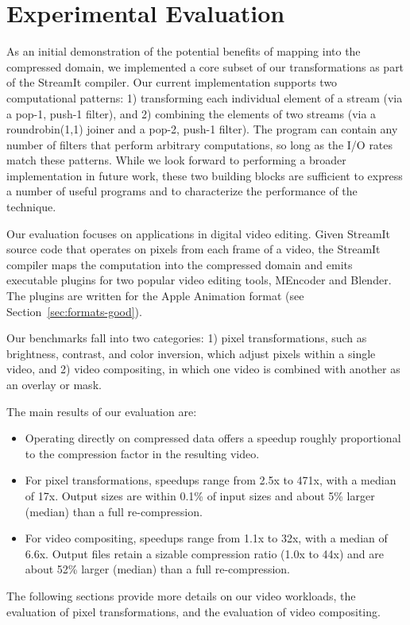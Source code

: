 \myend

\section{Experimental Evaluation}

As an initial demonstration of the potential benefits of mapping into
the compressed domain, we implemented a core subset of our
transformations as part of the StreamIt compiler.  Our current
implementation supports two computational patterns: 1) transforming
each individual element of a stream (via a pop-1, push-1 filter), and
2) combining the elements of two streams (via a roundrobin(1,1) joiner
and a pop-2, push-1 filter).  The program can contain any number of
filters that perform arbitrary computations, so long as the I/O rates
match these patterns.  While we look forward to performing a broader
implementation in future work, these two building blocks are
sufficient to express a number of useful programs and to characterize
the performance of the technique.

Our evaluation focuses on applications in digital video editing.
Given StreamIt source code that operates on pixels from each frame of
a video, the StreamIt compiler maps the computation into the
compressed domain and emits executable plugins for two popular video
editing tools, MEncoder and Blender.  The plugins are written for the
Apple Animation format (see Section~\ref{sec:formats-good}).

Our benchmarks fall into two categories: 1) pixel transformations,
such as brightness, contrast, and color inversion, which adjust pixels
within a single video, and 2) video compositing, in which one video is
combined with another as an overlay or mask.

\newpage\noindent
The main results of our evaluation are:
\begin{itemize}

\item Operating directly on compressed data offers a speedup roughly
proportional to the compression factor in the resulting video.

\item For pixel transformations, speedups range from 2.5x to 471x,
  with a median of 17x.  Output sizes are within 0.1\% of input sizes
  and about 5\% larger (median) than a full re-compression.

\item For video compositing, speedups range from 1.1x to 32x, with a
  median of 6.6x.  Output files retain a sizable compression ratio
  (1.0x to 44x) and are about 52\% larger (median) than a full
  re-compression.

\end{itemize}
The following sections provide more details on our video workloads,
the evaluation of pixel transformations, and the evaluation of video
compositing.

